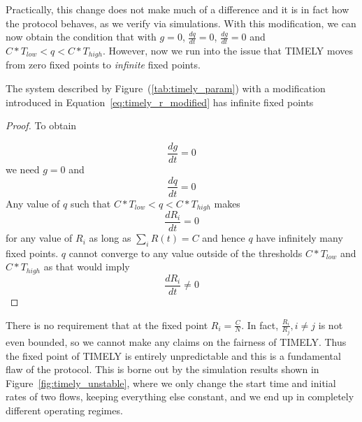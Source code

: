 Practically, this change does not make much of a difference and it is
in fact how the protocol behaves, as we verify via simulations. With this
modification, we can now obtain the condition that with $g =0$, $\tfrac{dq}{dt}
= 0$, $\tfrac{dg}{dt} = 0$ and $C*T_{low} < q < C*T_{high}$. However, now we run
into the issue that TIMELY moves from zero fixed points to \emph{infinite} fixed
points.
\begin{thm}
The system described by Figure~(\ref{tab:timely_param}) with a
modification introduced in Equation~\ref{eq:timely_r_modified} has
infinite fixed points
\end{thm}
\begin{proof}
 To obtain 

\small $$\frac{dg}{dt} =0$$ \normalsize
we need $g = 0$ and
\small $$\frac{dq}{dt} = 0$$ \normalsize
Any value of $q$ such that $C*T_{low} < q <
C*T_{high}$ makes 
\small $$\frac{dR_i}{dt} = 0$$ \normalsize
for any value of $R_i$ as
long as $\sum_{i} R(t) =  C$ and hence $q$ have infinitely many fixed
points. 
$q$ cannot converge to any value outside of the
thresholds $ C*{T_{low}}$ and $C*{T_{high}}$ as that would
imply 
\small $$\frac{dR_i}{dt} \ne 0$$ \normalsize
\end{proof}
There is no requirement that at the fixed point $R_i = \tfrac{C}{N}$. In
fact, $\tfrac{R_{i}}{R_{j}}, i \ne j$ is not even bounded, so we cannot make any
claims on the fairness of TIMELY. Thus the fixed point of TIMELY is entirely
unpredictable and this is a fundamental flaw of the protocol. This is borne out
by the simulation results shown in Figure~\ref{fig:timely_unstable}, where we
only change the start time and initial rates of two flows, keeping everything
else constant, and we end up in completely different operating regimes.


